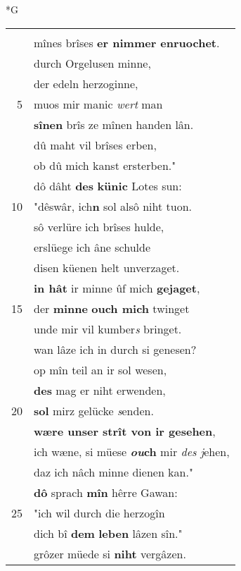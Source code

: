 \documentclass[8pt,a4paper,notitlepage]{article}
\begin{document}
\begin{table}[ht]
\begin{minipage}[t]{0.5\linewidth}
\small
\begin{center}*G
\end{center}
\begin{tabular}{rl}
 & \textit{\begin{large}V\end{large}}or got ich bin vervluochet,\\ 
 & mînes brîses \textbf{er nimmer enruochet}.\\ 
 & durch Orgelusen minne,\\ 
 & der edeln herzoginne,\\ 
5 & muos mir manic \textit{wert} man\\ 
 & \textbf{sînen} brîs ze mînen handen lân.\\ 
 & dû maht vil brîses erben,\\ 
 & ob dû mich kanst ersterben."\\ 
 & dô dâht \textbf{des} \textbf{künic} Lotes sun:\\ 
10 & "dêswâr, ich\textbf{n} sol alsô niht tuon.\\ 
 & sô verlüre ich brîses hulde,\\ 
 & erslüege ich âne schulde\\ 
 & disen küenen helt unverzaget.\\ 
 & \textbf{in hât} ir minne ûf mich \textbf{gejaget},\\ 
15 & der \textbf{minne} \textbf{ouch mich} twinget\\ 
 & unde mir vil kumber\textit{s} bringet.\\ 
 & wan lâze ich in durch si genesen?\\ 
 & op mîn teil an ir sol wesen,\\ 
 & \textbf{des} mag er niht erwenden,\\ 
20 & \textbf{sol} mirz gelücke \textit{s}enden.\\ 
 & \textbf{wære unser strît von ir gesehen},\\ 
 & ich wæne, si müese \textbf{\textit{ou}ch} mir \textit{des j}ehen,\\ 
 & daz ich nâch minne dienen kan."\\ 
 & \textbf{dô} sprach \textbf{mîn} hêrre Gawan:\\ 
25 & "ich wil durch die herzogîn\\ 
 & dich bî \textbf{dem} \textbf{leben} lâzen sîn."\\ 
 & grôzer müede si \textbf{niht} vergâzen.\\ 

\end{tabular}
\end{minipage}
\end{table}
\end{document}
